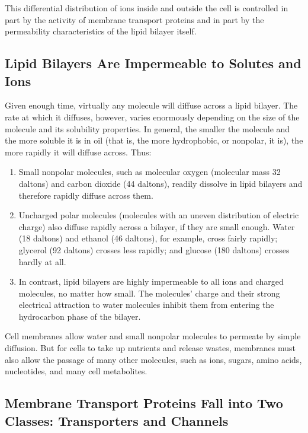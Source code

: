 This differential distribution of ions inside and outside the cell is controlled
in part by the activity of membrane transport proteins and in part by the
permeability characteristics of the lipid bilayer itself.

\subsection{Lipid Bilayers Are Impermeable to Solutes and Ions}


Given enough time, virtually any molecule will diffuse across a lipid bilayer.
The rate at which it diffuses, however, varies
enormously depending on the size of the molecule and its solubility properties.
In general, the smaller the molecule and the more soluble it is in
oil (that is, the more hydrophobic, or nonpolar, it is), the more rapidly it
will diffuse across. Thus:

\begin{enumerate}
\item Small nonpolar molecules, such as molecular oxygen (molecular
mass 32 daltons) and carbon dioxide (44 daltons), readily dissolve
in lipid bilayers and therefore rapidly diffuse across them.
\item Uncharged polar molecules (molecules with an uneven distribution
of electric charge) also diffuse rapidly across a bilayer, if they
are small enough. Water (18 daltons) and ethanol (46 daltons), for
example, cross fairly rapidly; glycerol (92 daltons) crosses less rapidly;
and glucose (180 daltons) crosses hardly at all.
\item In contrast, lipid bilayers are highly impermeable to all ions and
charged molecules, no matter how small. The molecules’ charge
and their strong electrical attraction to water molecules inhibit
them from entering the hydrocarbon phase of the bilayer.
\end{enumerate}

Cell membranes allow water and small nonpolar molecules to permeate
by simple diffusion. But for cells to take up nutrients and release wastes,
membranes must also allow the passage of many other molecules, such
as ions, sugars, amino acids, nucleotides, and many cell metabolites.

\subsection{Membrane Transport Proteins Fall into Two Classes: Transporters and Channels}

